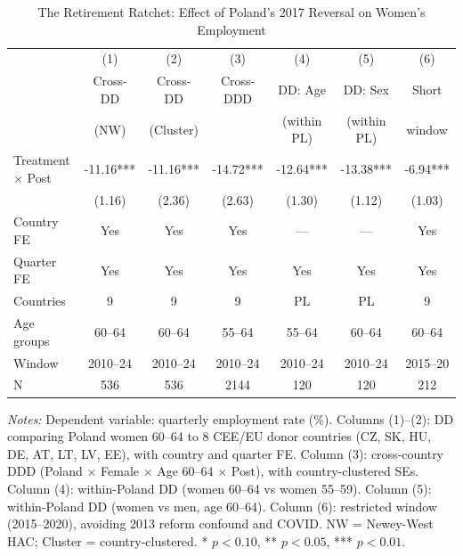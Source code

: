 \begin{table}[H]
\centering
\caption{The Retirement Ratchet: Effect of Poland's 2017 Reversal on Women's Employment}
\label{tab:main}
\small
\begin{tabular}{lcccccc}
\toprule
 & (1) & (2) & (3) & (4) & (5) & (6) \\
 & Cross-DD & Cross-DD & Cross-DDD & DD: Age & DD: Sex & Short \\
 & (NW) & (Cluster) & & (within PL) & (within PL) & window \\
\midrule
Treatment $\times$ Post & -11.16*** & -11.16*** & -14.72*** & -12.64*** & -13.38*** & -6.94*** \\
 & (1.16) & (2.36) & (2.63) & (1.30) & (1.12) & (1.03) \\[0.3em]
Country FE & Yes & Yes & Yes & --- & --- & Yes \\
Quarter FE & Yes & Yes & Yes & Yes & Yes & Yes \\
Countries & 9 & 9 & 9 & PL & PL & 9 \\
Age groups & 60--64 & 60--64 & 55--64 & 55--64 & 60--64 & 60--64 \\
Window & 2010--24 & 2010--24 & 2010--24 & 2010--24 & 2010--24 & 2015--20 \\
N & 536 & 536 & 2144 & 120 & 120 & 212 \\
\bottomrule
\end{tabular}
\par\vspace{0.3em}
{\footnotesize\raggedright \textit{Notes:} Dependent variable: quarterly employment rate (\%). Columns (1)--(2): DD comparing Poland women 60--64 to 8 CEE/EU donor countries (CZ, SK, HU, DE, AT, LT, LV, EE), with country and quarter FE. Column (3): cross-country DDD (Poland $\times$ Female $\times$ Age 60--64 $\times$ Post), with country-clustered SEs. Column (4): within-Poland DD (women 60--64 vs women 55--59). Column (5): within-Poland DD (women vs men, age 60--64). Column (6): restricted window (2015--2020), avoiding 2013 reform confound and COVID. NW = Newey-West HAC; Cluster = country-clustered. * $p<0.10$, ** $p<0.05$, *** $p<0.01$.\par}
\end{table}
